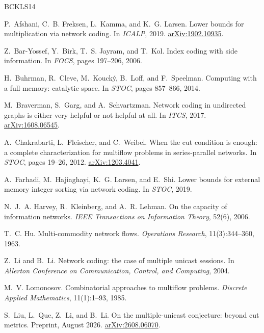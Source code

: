 \documentclass[11pt]{article}
\begin{document}
\begin{thebibliography}{BCKLS14}

P.~Afshani, C.~B. Freksen, L.~Kamma, and K.~G. Larsen.
\newblock Lower bounds for multiplication via network coding.
\newblock In \emph{ICALP}, 2019.
\newblock \href{https://arxiv.org/abs/1902.10935}{arXiv:1902.10935}.

Z.~Bar-Yossef, Y.~Birk, T.~S. Jayram, and T.~Kol.
\newblock Index coding with side information.
\newblock In \emph{FOCS}, pages 197--206, 2006.

H.~Buhrman, R.~Cleve, M.~Kouck\'y, B.~Loff, and F.~Speelman.
\newblock Computing with a full memory: catalytic space.
\newblock In \emph{STOC}, pages 857--866, 2014.

M.~Braverman, S.~Garg, and A.~Schvartzman.
\newblock Network coding in undirected graphs is either very helpful or not helpful at all.
\newblock In \emph{ITCS}, 2017.
\newblock \href{https://arxiv.org/abs/1608.06545}{arXiv:1608.06545}.

A.~Chakrabarti, L.~Fleischer, and C.~Weibel.
\newblock When the cut condition is enough: a complete characterization for multiflow problems in series-parallel networks.
\newblock In \emph{STOC}, pages 19--26, 2012.
\newblock \href{https://arxiv.org/abs/1203.4041}{arXiv:1203.4041}.

A.~Farhadi, M.~Hajiaghayi, K.~G. Larsen, and E.~Shi.
\newblock Lower bounds for external memory integer sorting via network coding.
\newblock In \emph{STOC}, 2019.

N.~J.~A. Harvey, R.~Kleinberg, and A.~R. Lehman.
\newblock On the capacity of information networks.
\newblock \emph{IEEE Transactions on Information Theory}, 52(6), 2006.

T.~C. Hu.
\newblock Multi-commodity network flows.
\newblock \emph{Operations Research}, 11(3):344--360, 1963.

Z.~Li and B.~Li.
\newblock Network coding: the case of multiple unicast sessions.
\newblock In \emph{Allerton Conference on Communication, Control, and Computing}, 2004.

M.~V. Lomonosov.
\newblock Combinatorial approaches to multiflow problems.
\newblock \emph{Discrete Applied Mathematics}, 11(1):1--93, 1985.

S.~Liu, L.~Que, Z.~Li, and B.~Li.
\newblock On the multiple-unicast conjecture: beyond cut metrics.
\newblock Preprint, August 2026.
\newblock \href{https://arxiv.org/abs/2608.06070}{arXiv:2608.06070}.


\end{thebibliography}
\end{document}
